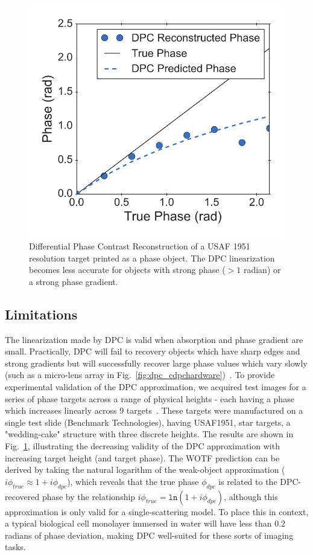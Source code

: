 \begin{figure}[tbh]
\centering
\includegraphics[width=1.0\textwidth]{figures/fig_phase_dpc_validation_2.pdf}
\caption{\label{fig:dpc_validation}
Differential Phase Contrast Reconstruction of a USAF 1951 resolution target printed as a phase object. The DPC linearization becomes less accurate for objects with strong phase ($> 1$ radian) or a strong phase gradient.}
\end{figure}

\subsection{Limitations}
The linearization made by DPC is valid when absorption and phase gradient are small. Practically, DPC will fail to recovery objects which have sharp edges and strong gradients but will successfully recover large phase values which vary slowly (such as a micro-lens array in Fig.~\ref{fig:dpc_cdpchardware})~\cite{Claus2015, chen2018quantitative}. To provide experimental validation of the DPC approximation, we acquired test images for a series of phase targets across a range of physical heights - each having a phase which increases linearly across 9 targets~\cite{phillipstechnical}. These targets were manufactured on a single test slide (Benchmark Technologies), having USAF1951, star targets, a "wedding-cake" structure with three discrete heights. The results are shown in Fig.~\ref{fig:dpc_validation}, illustrating the decreasing validity of the DPC approximation with increasing target height (and target phase). The WOTF prediction can be derived by taking the natural logarithm of the weak-object approximation ($i\phi_{true} \approx 1 + i\phi_{dpc}$), which reveals that the true phase $\phi_{dpc}$ is related to the DPC-recovered phase by the relationship $i\phi_{true}= \texttt{ln}(1 + i\phi_{dpc})$, although this approximation is only valid for a single-scattering model. To place this in context, a typical biological cell monolayer immersed in water will have less than 0.2 radians of phase deviation, making DPC well-suited for these sorts of imaging tasks.

